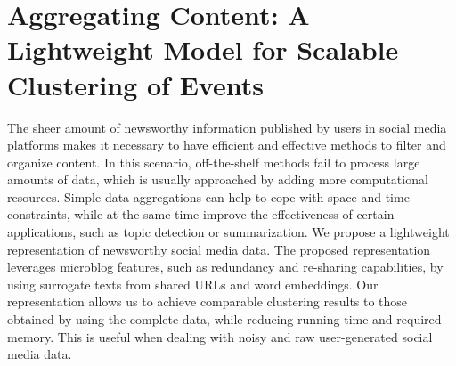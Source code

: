\chapter{Aggregating Content: A Lightweight Model for Scalable Clustering of Events}

The sheer amount of newsworthy information published by users in social media
platforms makes it necessary to have efficient and effective methods to filter
and organize content. 
%
In this scenario, off-the-shelf methods fail to process large amounts of data,
which is usually approached by adding more computational resources. 
%
Simple data aggregations can help to cope with space and time constraints,
while at the same time improve the effectiveness of certain applications, such
as topic detection or summarization. 
%
We propose a lightweight representation of newsworthy social media data. 
%
The proposed representation leverages microblog features, such as redundancy
and re-sharing capabilities, by using surrogate texts from shared URLs and
word embeddings.
%
Our representation allows us to achieve comparable clustering results to those obtained by using the complete data, while reducing running time and required memory.
%
This is useful when dealing with noisy and raw user-generated social media data.
 










